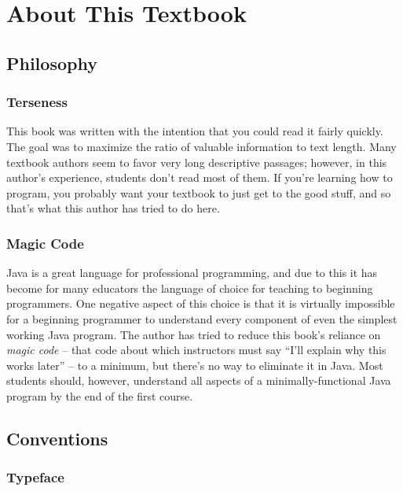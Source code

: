 
\chapter{About This Textbook}

\minitoc

\section*{Philosophy}

\subsection*{Terseness}
This book was written with the intention that you could read it fairly quickly.  The goal was to maximize the ratio of valuable information to text length.  Many textbook authors seem to favor very long descriptive passages; however, in this author's experience, students don't read most of them.  If you're learning how to program, you probably want your textbook to just get to the good stuff, and so that's what this author has tried to do here.

\subsection*{Magic Code}\label{subsection:magiccode}
Java is a great language for professional programming, and due to this it has become for many educators the language of choice for teaching to beginning programmers.  One negative aspect of this choice is that it is virtually impossible for a beginning programmer to understand every component of even the simplest working Java program.  The author has tried to reduce this book's reliance on \textit{magic code} -- that code about which instructors must say ``I'll explain why this works later'' -- to a minimum, but there's no way to eliminate it in Java.  Most students should, however, understand all aspects of a minimally-functional Java program by the end of the first course.

\section*{Conventions}

\subsection*{Typeface}

